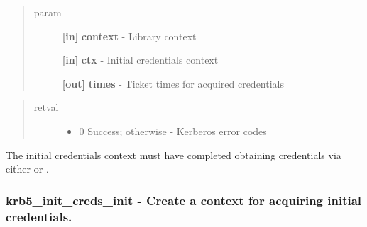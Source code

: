 \documentclass[letterpaper,10pt,english]{sphinxmanual}
\begin{document}
\begin{quote}\begin{description}
\item[{param}] \leavevmode
\textbf{{[}in{]}} \textbf{context} - Library context

\textbf{{[}in{]}} \textbf{ctx} - Initial credentials context

\textbf{{[}out{]}} \textbf{times} - Ticket times for acquired credentials

\end{description}\end{quote}
\begin{quote}\begin{description}
\item[{retval}] \leavevmode\begin{itemize}
\item {} 
0   Success; otherwise - Kerberos error codes

\end{itemize}

\end{description}\end{quote}

The initial credentials context must have completed obtaining credentials via either {\hyperref[appdev/refs/api/krb5_init_creds_get:krb5_init_creds_get]{}} or {\hyperref[appdev/refs/api/krb5_init_creds_step:krb5_init_creds_step]{}} .


\subsubsection{krb5\_init\_creds\_init -  Create a context for acquiring initial credentials.}
\label{appdev/refs/api/krb5_init_creds_init::doc}\label{appdev/refs/api/krb5_init_creds_init:krb5-init-creds-init-create-a-context-for-acquiring-initial-credentials}

\begin{fulllineitems}
\label{appdev/refs/api/krb5_init_creds_init:krb5_init_creds_init}
\end{fulllineitems}
\end{document}
